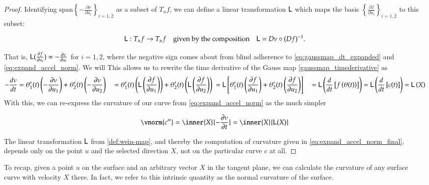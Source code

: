 \begin{proof}
	
	Identifying $\textrm{span}\left\{ - \frac{\partial \nu}{\partial u_i}\right\}_{i=1,2}$ as a subset of $T_u f$,  we can define a linear transformation $\mathsf{L}$ which maps the basis
	$\left\{ \frac{\partial f}{\partial u_i}\right\}_{i=1,2}$ to this subset:
	
	\begin{defn} \label{def:wein-map}
		\[
		\mathsf{L}: T_u f \to T_u f 
		\quad \textrm{given by the composition} \quad
		\mathsf{L} = D\nu \circ (Df)^{-1}.
		\]
	\end{defn}
	That is, $\mathsf{L}(\frac{\partial f}{\partial u_i}) = - \frac{\partial \nu}{\partial u_i} $ for $i=1,2$, where the negative sign comes about from blind adherence to \cref{eq:gaussmap_dt_expanded} and \cref{eq:expand_accel_norm}. We will This allows us to rewrite the time derivative of the Gauss map \cref{gaussmap_timederivative} as
		\begin{align}
		-\frac{d \nu}{dt} &= 
		\theta_1'(t)\left( - \frac{\partial \nu}{\partial u_1} \right) + 
		\theta_2'(t)\left( - \frac{\partial \nu}{\partial u_2} \right) \
		&= \theta_1'(t)\left( \mathsf{L}\left(\frac{\partial f}{\partial u_1}\right) \right) + 
		\theta_2'(t)\left( \mathsf{L}\left(\frac{\partial f}{\partial u_2}\right) \right) \
		&= \mathsf{L}\left[\theta_1'(t)\left( \frac{\partial f}{\partial u_1}\right)  + 
		\theta_2'(t)\left( \frac{\partial f}{\partial u_2} \right)\right] \
		&= \mathsf{L}\left(\frac{d}{dt}\left[ f\left(\theta(t)\right)\right] \right)
		= \mathsf{L}\left( \frac{d}{dt} \left[ c(t) \right] \right) = \mathsf{L}\left(X\right)
		\end{align} 
		With this, we can re-express the curvature of our curve from
		\cref{eq:expand_accel_norm} as the much simpler
		
		\begin{equation} \label{eq:expand_accel_norm_final}
		\vnorm{c''} = \inner{X}{-\frac{\partial \nu}{\partial t}} = \inner{X}{\wein(X)}
		\end{equation}
		
	
	The linear transformation $\mathsf{L}$ from \cref{def:wein-map}, and thereby
	the computation of curvature given in \cref{eq:expand_accel_norm_final},
	depends only on the point $u$ and the selected direction $X$, not on the particular curve $c$ at all.
	\end{proof}
	To recap, given a point $u$ on the surface and an arbitrary vector $X$ in the tangent plane, we can calculate the curvature of any surface curve with velocity $X$ there. In fact, we refer to this intrinsic quantity as the normal curvature of the surface.
	
